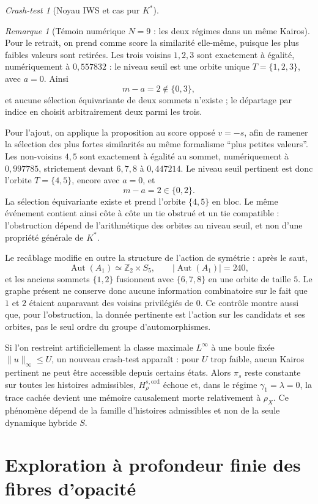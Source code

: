 \documentclass[11pt,a4paper]{article}
\theoremstyle{definition}
\theoremstyle{remark}
\newtheorem{remark}[definition]{Remarque}
\newtheorem{crashtest}[definition]{Crash-test}
\begin{document}
\begin{crashtest}[Noyau IWS et cas pur $K^*$]
\begin{remark}[Témoin numérique $N=9$ : les deux régimes dans un même Kairos]
Pour le retrait, on prend comme score la similarité elle-même, puisque les plus faibles valeurs sont retirées. Les trois voisins $1,2,3$ sont exactement à égalité, numériquement à $0{,}557832$ : le niveau seuil est une orbite unique $T=\{1,2,3\}$, avec $a=0$. Ainsi
\[
m-a=2\notin\{0,3\},
\]
et aucune sélection équivariante de deux sommets n'existe ; le départage par indice en choisit arbitrairement deux parmi les trois.

Pour l'ajout, on applique la proposition au score opposé $v=-s$, afin de ramener la sélection des plus fortes similarités au même formalisme ``plus petites valeurs''. Les non-voisins $4,5$ sont exactement à égalité au sommet, numériquement à $0{,}997785$, strictement devant $6,7,8$ à $0{,}447214$. Le niveau seuil pertinent est donc l'orbite $T=\{4,5\}$, encore avec $a=0$, et
\[
m-a=2\in\{0,2\}.
\]
La sélection équivariante existe et prend l'orbite $\{4,5\}$ en bloc. Le même événement contient ainsi côte à côte un tie obstrué et un tie compatible : l'obstruction dépend de l'arithmétique des orbites au niveau seuil, et non d'une propriété générale de $K^*$.

Le recâblage modifie en outre la structure de l'action de symétrie : après le saut,
\[
\operatorname{Aut}(A_1)\simeq\mathbb Z_2\times S_5,
\qquad |\operatorname{Aut}(A_1)|=240,
\]
et les anciens sommets $\{1,2\}$ fusionnent avec $\{6,7,8\}$ en une orbite de taille $5$. Le graphe présent ne conserve donc aucune information combinatoire sur le fait que $1$ et $2$ étaient auparavant des voisins privilégiés de $0$. Ce contrôle montre aussi que, pour l'obstruction, la donnée pertinente est l'action sur les candidats et ses orbites, pas le seul ordre du groupe d'automorphismes.
\end{remark}

Si l'on restreint artificiellement la classe maximale $L^\infty$ à une boule fixée $\|u\|_\infty\leq U$, un nouveau crash-test apparaît : pour $U$ trop faible, aucun Kairos pertinent ne peut être accessible depuis certains états. Alors $\pi_s$ reste constante sur toutes les histoires admissibles, $H_\rho^{s,\mathrm{ord}}$ échoue et, dans le régime $\gamma_1=\lambda=0$, la trace cachée devient une mémoire causalement morte relativement à $\rho_X$. Ce phénomène dépend de la famille d'histoires admissibles et non de la seule dynamique hybride $S$.
\end{crashtest}


\section{Exploration à profondeur finie des fibres d'opacité}
\label{sec:opacity-finite-depth}
\end{document}
